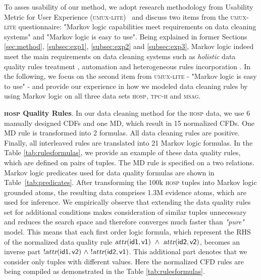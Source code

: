 
To asses usability of our method, we adopt research methodology from Usability Metric for User Experience (\textsc{umux-lite})~\cite{Lewis2013UMUX, Finstad2010} and discuss two items from the \textsc{umux-lite} questionnaire: "Markov logic capabilities meet requirements on data cleaning systems" and "Markov logic is easy to use". Being explained in former Sections \ref{sec:method}, \ref{subsec:exp1}, \ref{subsec:exp2} and \ref{subsec:exp3}, Markov logic indeed meet the main requirements on data cleaning systems such as \textit{holistic} data quality rules treatment \cite{Fan:2014:IRM:2628135.2567657, Dallachiesa:2013:NCD:2463676.2465327}, automation \cite{Stonebraker_datacuration} and heterogeneous rules incorporation \cite{chu2013holistic}. In the following, we focus on the second item from \textsc{umux-lite} - "Markov logic is easy to use" - and provide our experience in how we modeled data cleaning rules by using Markov logic on all three data sets \textsc{hosp}, \textsc{tpc-h} and \textsc{msag}. %

\textbf{\textsc{hosp} Quality Rules}. In our data cleaning method for the \textsc{hosp} data, we use 6 manually designed CDFs and one MD, which result in 15 normalized CFDs. One MD rule is transformed into 2 formulas. All data cleaning rules are positive. Finally, all interleaved rules are translated into 21 Markov logic formulas. In the Table \ref{tab:rulesformulas}, we provide an example of these data quality rules, which are defined on pairs of tuples. The MD rule is specified on a two relations. Markov logic predicates used for data quality formulas are shown in Table~\ref{tab:predicates}. After transforming the 100k \textsc{hosp} tuples into Markov logic grounded atoms, the resulting data comprises 1.3M evidence atoms, which are used for inference. We empirically observe that extending the data quality rules set for additional conditions makes consideration of similar tuples unnecessary and reduces the search space and therefore converges much faster than \textit{"pure"} model. This means that each first order logic formula, which represent the RHS of the normalized data quality rule $\mathsf{\textsl{attr}(id1, v1)~\wedge~\textsl{attr}(id2, v2)}$, becomes an inverse part $\mathsf{!\textsl{attr}(id1, v2)~\wedge~!\textsl{attr}(id2, v1)}$. This additional part denotes that we consider only tuples with different values. Here the normalized CFD rules are being compiled as demonstrated in the Table \ref{tab:rulesformulas}. 

